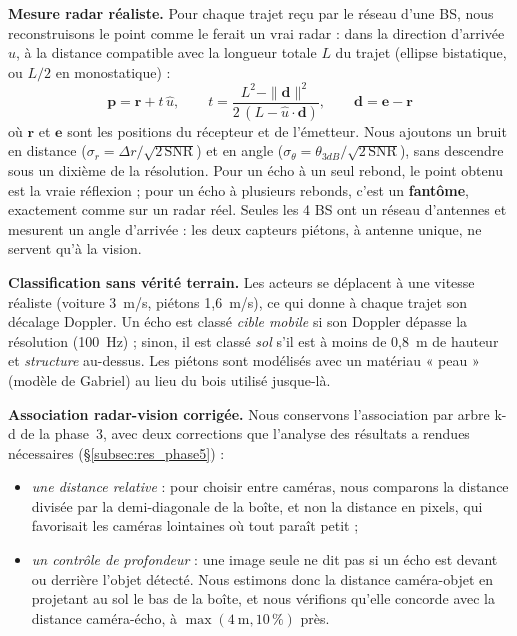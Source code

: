 \documentclass[12pt,a4paper,titlepage]{article}
\begin{document}
\textbf{Mesure radar réaliste.} Pour chaque trajet reçu par le réseau d'une BS, nous reconstruisons le point comme le ferait un vrai radar : dans la direction d'arrivée $\hat{u}$, à la distance compatible avec la longueur totale $L$ du trajet (ellipse bistatique, ou $L/2$ en monostatique) :
\begin{equation}
    \mathbf{p} = \mathbf{r} + t\,\hat{u}, \qquad t = \frac{L^2 - \|\mathbf{d}\|^2}{2\,(L - \hat{u}\cdot\mathbf{d})}, \qquad \mathbf{d} = \mathbf{e} - \mathbf{r}
    \label{eq:point_apparent}
\end{equation}
où $\mathbf{r}$ et $\mathbf{e}$ sont les positions du récepteur et de l'émetteur. Nous ajoutons un bruit en distance ($\sigma_r = \Delta r/\sqrt{2\,\mathrm{SNR}}$) et en angle ($\sigma_\theta = \theta_{3dB}/\sqrt{2\,\mathrm{SNR}}$), sans descendre sous un dixième de la résolution. Pour un écho à un seul rebond, le point obtenu est la vraie réflexion ; pour un écho à plusieurs rebonds, c'est un \textbf{fantôme}, exactement comme sur un radar réel. Seules les 4 BS ont un réseau d'antennes et mesurent un angle d'arrivée : les deux capteurs piétons, à antenne unique, ne servent qu'à la vision.

\textbf{Classification sans vérité terrain.} Les acteurs se déplacent à une vitesse réaliste (voiture 3~m/s, piétons 1,6~m/s), ce qui donne à chaque trajet son décalage Doppler. Un écho est classé \emph{cible mobile} si son Doppler dépasse la résolution (100~Hz) ; sinon, il est classé \emph{sol} s'il est à moins de 0,8~m de hauteur et \emph{structure} au-dessus. Les piétons sont modélisés avec un matériau « peau » (modèle de Gabriel) au lieu du bois utilisé jusque-là.

\textbf{Association radar-vision corrigée.} Nous conservons l'association par arbre k-d de la phase~3, avec deux corrections que l'analyse des résultats a rendues nécessaires (\S\ref{subsec:res_phase5}) :
\begin{itemize}[leftmargin=1.5em]
    \item \emph{une distance relative} : pour choisir entre caméras, nous comparons la distance divisée par la demi-diagonale de la boîte, et non la distance en pixels, qui favorisait les caméras lointaines où tout paraît petit ;
    \item \emph{un contrôle de profondeur} : une image seule ne dit pas si un écho est devant ou derrière l'objet détecté. Nous estimons donc la distance caméra-objet en projetant au sol le bas de la boîte, et nous vérifions qu'elle concorde avec la distance caméra-écho, à $\max(4~\text{m}, 10\,\%)$ près.
\end{itemize}
\end{document}

